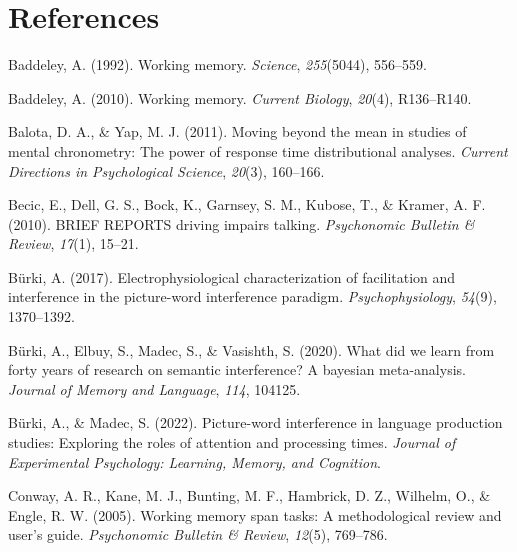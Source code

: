 \documentclass[
  man,floatsintext]{apa6}
\newlength{\cslhangindent}
\newlength{\cslentryspacingunit} %
\newenvironment{CSLReferences}[2] %
 {%
  \setlength{\parindent}{0pt}
  \ifodd #1
  \let\oldpar\par
  \def\par{\hangindent=\cslhangindent\oldpar}
  \fi
  \setlength{\parskip}{#2\cslentryspacingunit}
 }%
 {}
\begin{document}
\clearpage

\hypertarget{references}{%
\section{References}\label{references}}

\hypertarget{refs}{}
\begin{CSLReferences}{1}{0}
\leavevmode{}%
Baddeley, A. (1992). Working memory. \emph{Science}, \emph{255}(5044), 556--559.

\leavevmode{}%
Baddeley, A. (2010). Working memory. \emph{Current Biology}, \emph{20}(4), R136--R140.

\leavevmode{}%
Balota, D. A., \& Yap, M. J. (2011). Moving beyond the mean in studies of mental chronometry: The power of response time distributional analyses. \emph{Current Directions in Psychological Science}, \emph{20}(3), 160--166.

\leavevmode{}%
Becic, E., Dell, G. S., Bock, K., Garnsey, S. M., Kubose, T., \& Kramer, A. F. (2010). BRIEF REPORTS driving impairs talking. \emph{Psychonomic Bulletin \& Review}, \emph{17}(1), 15--21.

\leavevmode{}%
Bürki, A. (2017). Electrophysiological characterization of facilitation and interference in the picture-word interference paradigm. \emph{Psychophysiology}, \emph{54}(9), 1370--1392.

\leavevmode{}%
Bürki, A., Elbuy, S., Madec, S., \& Vasishth, S. (2020). What did we learn from forty years of research on semantic interference? A bayesian meta-analysis. \emph{Journal of Memory and Language}, \emph{114}, 104125.

\leavevmode{}%
Bürki, A., \& Madec, S. (2022). Picture-word interference in language production studies: Exploring the roles of attention and processing times. \emph{Journal of Experimental Psychology: Learning, Memory, and Cognition}.

\leavevmode{}%
Conway, A. R., Kane, M. J., Bunting, M. F., Hambrick, D. Z., Wilhelm, O., \& Engle, R. W. (2005). Working memory span tasks: A methodological review and user's guide. \emph{Psychonomic Bulletin \& Review}, \emph{12}(5), 769--786.


\end{CSLReferences}
\end{document}
